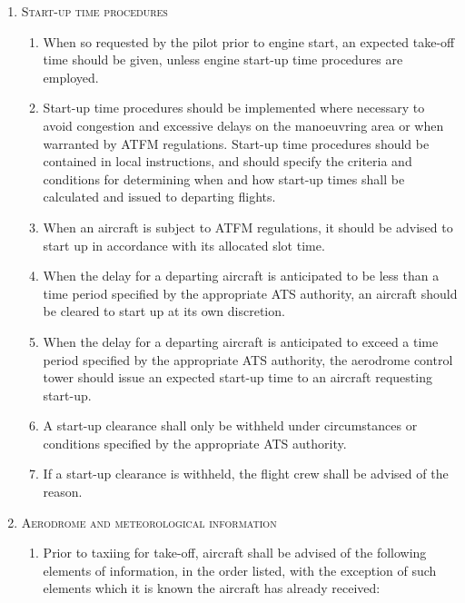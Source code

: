 \documentclass[../main.tex]{subfiles}
\begin{document}
    \begin{enumerate}[itemsep=0.2cm]\centering
        \item \textsc{Start-up time procedures}
        \begin{enumerate}
            \item When so requested by the pilot prior to engine start, an expected take-off time should be given, unless engine start-up time procedures are employed.
            \item Start-up time procedures should be implemented where necessary to avoid congestion and excessive delays on the manoeuvring area or when warranted by ATFM regulations. Start-up time procedures should be contained in local instructions, and should specify the criteria and conditions for determining when and how start-up times shall be calculated and issued to departing flights.
            \item When an aircraft is subject to ATFM regulations, it should be advised to start up in accordance with its allocated slot time.
            \item When the delay for a departing aircraft is anticipated to be less than a time period specified by the appropriate ATS authority, an aircraft should be cleared to start up at its own discretion.
            \item When the delay for a departing aircraft is anticipated to exceed a time period specified by the appropriate ATS authority, the aerodrome control tower should issue an expected start-up time to an aircraft requesting start-up.
            \item A start-up clearance shall only be withheld under circumstances or conditions specified by the appropriate ATS authority.
            \item If a start-up clearance is withheld, the flight crew shall be advised of the reason.
        \end{enumerate}

        \item \textsc{Aerodrome and meteorological information}
        \begin{enumerate}
            \item \label{7.4.1.2.1} Prior to taxiing for take-off, aircraft shall be advised of the following elements of information, in the order listed, with the exception of such elements which it is known the aircraft has already received:
            

\end{enumerate}
\end{enumerate}
\end{document}
